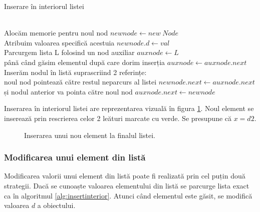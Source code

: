 \begin{algorithm}[H]
	\caption{Inserare în interiorul listei}\label{alg:insertinterior}
	\begin{algorithmic}[1]
		 \\		
		\Comment Alocăm memorie pentru noul nod \hfill \tab{}\tab{}\tab{}
		\State $newnode \gets new \hspace{3pt} Node$\\
		\Comment Atribuim valoarea specifică acestuia \hfill \tab{}\tab{}\tab{}
		\State $newnode.d \gets val$\\
		\Comment Parcurgem lista L folosind un nod auxiliar  \hfill \tab{}\tab{}
		\State $auxnode \gets L$\\
		\Comment până când găsim elementul după care dorim inserția  \hfill \tab{}
		\While {$auxnode.d \neq  x$}
		\State $auxnode \gets auxnode.next$
		\EndWhile 	\\
		\Comment Inserăm nodul în listă suprascriind 2 referințe: \hfill \tab{} \tab{} \\
		\Comment noul nod pointează către restul neparcurs al listei\hfill \tab{} 
		\State $newnode.next \gets auxnode.next$\\
		\Comment și nodul anterior va pointa către noul nod\hfill  \tab{} \tab{}
		\State $auxnode.next \gets newnode$
		\EndProcedure
	\end{algorithmic}
\end{algorithm}

Inserarea în interiorul listei are reprezentarea vizuală în figura \ref{fig:insertinterior}. Noul element se inserează prin rescrierea celor 2 leături marcate cu verde. Se presupune că $x=d2$.

\begin{figure}[H] 
	\centering	
	{
	}
	\caption{Inserarea unui nou element la finalul listei.} 
	\label{fig:insertinterior}
\end{figure}

\subsubsection{Modificarea unui element din listă}

Modificarea valorii unui element din listă poate fi realizată prin cel puțin două strategii. Dacă se cunoaște valoarea elementului din listă se parcurge lista exact ca în algoritmul \ref{alg:insertinterior}. Atunci când elementul este găsit, se modifică valoarea $d$ a obiectului.

